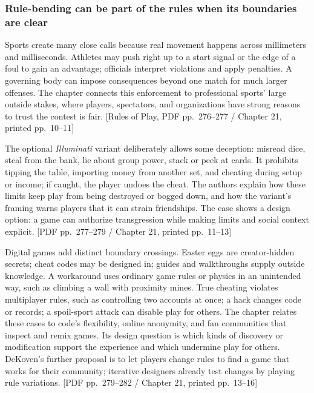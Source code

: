 \subsubsection{Rule-bending can be part of the rules when its boundaries are clear}\label{05-engine-i-ch009-rule-bending-can-be-part-of-the-rules-when-its-boundaries-are-clear}

Sports create many close calls because real movement happens across millimeters and milliseconds. Athletes may push right up to a start signal or the edge of a foul to gain an advantage; officials interpret violations and apply penalties. A governing body can impose consequences beyond one match for much larger offenses. The chapter connects this enforcement to professional sports' large outside stakes, where players, spectators, and organizations have strong reasons to trust the contest is fair. {[}Rules of Play, PDF pp.~276--277 / Chapter 21, printed pp.~10--11{]}

The optional \emph{Illuminati} variant deliberately allows some deception: misread dice, steal from the bank, lie about group power, stack or peek at cards. It prohibits tipping the table, importing money from another set, and cheating during setup or income; if caught, the player undoes the cheat. The authors explain how these limits keep play from being destroyed or bogged down, and how the variant's framing warns players that it can strain friendships. The case shows a design option: a game can authorize transgression while making limits and social context explicit. {[}PDF pp.~277--279 / Chapter 21, printed pp.~11--13{]}

Digital games add distinct boundary crossings. Easter eggs are creator-hidden secrets; cheat codes may be designed in; guides and walkthroughs supply outside knowledge. A workaround uses ordinary game rules or physics in an unintended way, such as climbing a wall with proximity mines. True cheating violates multiplayer rules, such as controlling two accounts at once; a hack changes code or records; a spoil-sport attack can disable play for others. The chapter relates these cases to code's flexibility, online anonymity, and fan communities that inspect and remix games. Its design question is which kinds of discovery or modification support the experience and which undermine play for others. DeKoven's further proposal is to let players change rules to find a game that works for their community; iterative designers already test changes by playing rule variations. {[}PDF pp.~279--282 / Chapter 21, printed pp.~13--16{]}

